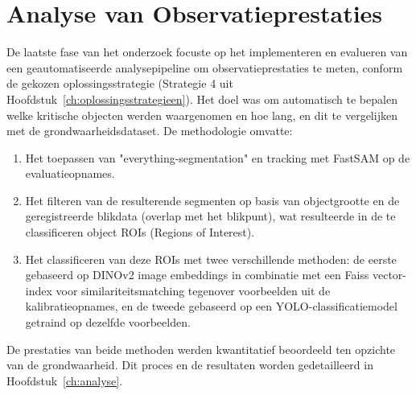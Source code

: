 \section{Analyse van Observatieprestaties}

De laatste fase van het onderzoek focuste op het implementeren en evalueren van een geautomatiseerde analysepipeline om observatieprestaties te meten, conform de gekozen oplossingsstrategie (Strategie 4 uit Hoofdstuk~\ref{ch:oplossingsstrategieen}). Het doel was om automatisch te bepalen welke kritische objecten werden waargenomen en hoe lang, en dit te vergelijken met de grondwaarheidsdataset. De methodologie omvatte:
\begin{enumerate}
  \item Het toepassen van "everything-segmentation" en tracking met FastSAM op de evaluatieopnames.
  \item Het filteren van de resulterende segmenten op basis van objectgrootte en de geregistreerde 
  blikdata (overlap met het blikpunt), wat resulteerde in de te classificeren object ROIs (Regions of Interest).
  \item Het classificeren van deze ROIs met twee verschillende methoden: de eerste gebaseerd op DINOv2 image 
  embeddings in combinatie met een Faiss vector-index voor similariteitsmatching tegenover voorbeelden uit de kalibratieopnames, 
  en de tweede gebaseerd op een YOLO-classificatiemodel getraind op dezelfde voorbeelden.
\end{enumerate}
De prestaties van beide methoden werden kwantitatief beoordeeld ten opzichte van de grondwaarheid. 
Dit proces en de resultaten worden gedetailleerd in Hoofdstuk~\ref{ch:analyse}.
